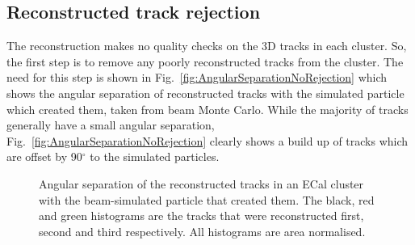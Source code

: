 \subsection{Reconstructed track rejection}
\label{subsec:BadTrackRejection}
The reconstruction makes no quality checks on the 3D tracks in each cluster.  So, the first step is to remove any poorly reconstructed tracks from the cluster.  The need for this step is shown in Fig.~\ref{fig:AngularSeparationNoRejection} which shows the angular separation of reconstructed tracks with the simulated particle which created them, taken from beam Monte Carlo.  While the majority of tracks generally have a small angular separation, Fig.~\ref{fig:AngularSeparationNoRejection} clearly shows a build up of tracks which are offset by 90$^\circ$ to the simulated particles.
\newline
\newline
\begin{figure}%
  \centering
  \caption{Angular separation of the reconstructed tracks in an ECal cluster with the beam-simulated particle that created them.  The black, red and green histograms are the tracks that were reconstructed first, second and third respectively.  All histograms are area normalised.}
  \label{fig:TrackRejectionAngularSeparation}
\end{figure}
